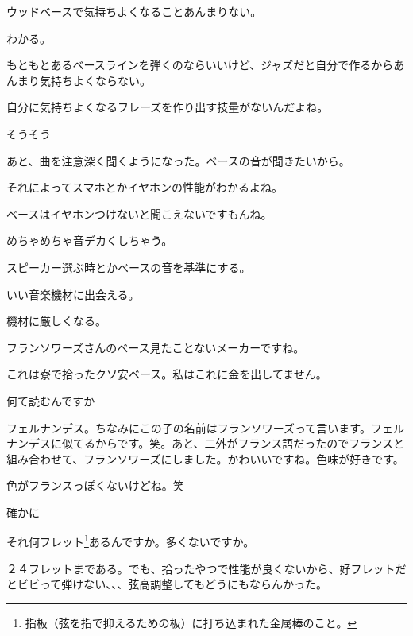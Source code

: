 \begin{multicols}{3}
ウッドベースで気持ちよくなることあんまりない。

わかる。

もともとあるベースラインを弾くのならいいけど、ジャズだと自分で作るからあんまり気持ちよくならない。

自分に気持ちよくなるフレーズを作り出す技量がないんだよね。

そうそう
 

あと、曲を注意深く聞くようになった。ベースの音が聞きたいから。

それによってスマホとかイヤホンの性能がわかるよね。

ベースはイヤホンつけないと聞こえないですもんね。

めちゃめちゃ音デカくしちゃう。

スピーカー選ぶ時とかベースの音を基準にする。

いい音楽機材に出会える。

機材に厳しくなる。
 


\vspace{10mm}
\noindent{}

フランソワーズさんのベース見たことないメーカーですね。

これは寮で拾ったクソ安ベース。私はこれに金を出してません。

何て読むんですか

フェルナンデス。ちなみにこの子の名前はフランソワーズって言います。フェルナンデスに似てるからです。笑。あと、二外がフランス語だったのでフランスと組み合わせて、フランソワーズにしました。かわいいですね。色味が好きです。

色がフランスっぽくないけどね。笑

確かに

それ何フレット\footnote{指板（弦を指で抑えるための板）に打ち込まれた金属棒のこと。}あるんですか。多くないですか。

２４フレットまである。でも、拾ったやつで性能が良くないから、好フレットだとビビって弾けない、、、弦高調整してもどうにもならんかった。


\end{multicols}
